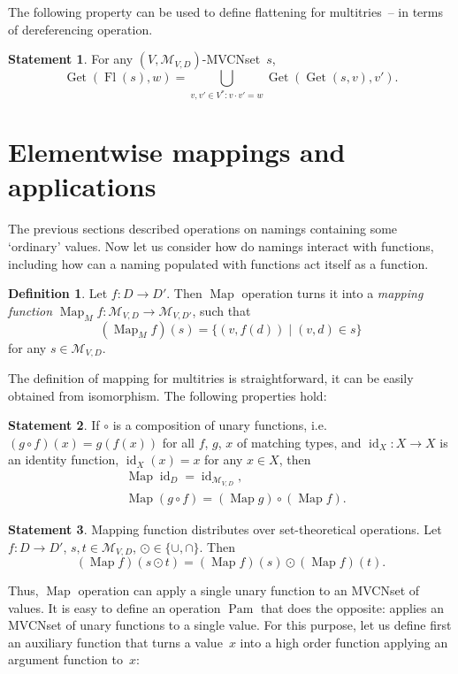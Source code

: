 \documentclass{article}
\theoremstyle{definition}
\newtheorem{Df}{Definition}
\newtheorem{St}{Statement}
\newcommand{\setcharmvcn}{M}
\newcommand{\setsymbol}[3]{\mathcal{#1}_{#2,#3}}
\newcommand{\setmvcn}[2]{\setsymbol{\setcharmvcn}{#1}{#2}}
\newcommand{\flatten}{\operatorname{Fl}}
\newcommand{\deref}{\operatorname{Get}}
\newcommand{\fmap}{\operatorname{Map}}
\newcommand{\fpam}{\operatorname{Pam}}
\newcommand{\id}{\operatorname{id}}
\begin{document}
The following property can be used to define flattening for multitries~--
in terms of dereferencing operation.
\begin{St}\label{st:deref-flatten}
For any $(V,\setmvcn{V}{D})$-MVCNset~$s$,
\[
  \deref(\flatten(s), w) =
      \bigcup_{v,v'\in V^\ast: v\cdot v' = w}
        \deref(\deref(s, v), v') .
\]
\end{St}



\section{Elementwise mappings and applications}

The previous sections described operations on namings containing some
`ordinary' values. Now let us consider how do namings interact with
functions, including how can a naming populated with functions act itself
as a function.

\begin{Df}\label{df:mvcn-map}
Let $f : D \to D'$. Then $\fmap$ operation turns it into a \emph{mapping
function} $\fmap_{\setcharmvcn} f : \setmvcn{V}{D} \to \setmvcn{V}{D'}$, such
that
\[
  (\fmap_{\setcharmvcn} f)(s) = \{ (v, f(d)) \mid (v, d) \in s \}
\]
for any $s \in \setmvcn{V}{D}$.
\end{Df}

The definition of mapping for multitries is straightforward, it can be easily
obtained from isomorphism. The following properties hold:

\begin{St}\label{st:map-properties}
If $\circ$ is a composition of unary functions, i.e. $(g\circ f)(x) = g(f(x))$ for
all $f$, $g$, $x$ of matching types, and $\id_X : X \to X$ is an identity function,
$\id_X(x) = x$ for any $x\in X$, then
\begin{eqnarray*}
  & \fmap \id_D = \id_{\setmvcn{V}{D}} , \\
  & \fmap (g \circ f) = (\fmap g) \circ (\fmap f) .
\end{eqnarray*}
\end{St}

\begin{St}\label{st:map-distributivity}
Mapping function distributes over set-theoretical operations.
Let $f: D \to D'$, $s, t \in \setmvcn{V}{D}$, $\odot \in \{\cup, \cap \}$. Then
\[
  (\fmap f) (s \odot t) = (\fmap f)(s) \odot (\fmap f)(t) .
\]
\end{St}

Thus, $\fmap$ operation can apply a single unary function to an MVCNset of
values. It is easy to define an operation $\fpam$ that does the opposite:
applies an MVCNset of unary functions to a single value. For this purpose,
let us define first an auxiliary function that turns a value~$x$ into a
high order function applying an argument function to~$x$:
\end{document}
